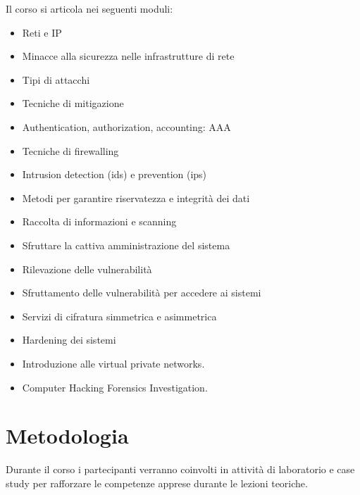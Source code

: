 Il corso si articola nei seguenti moduli:
\begin{itemize}
	
\item Reti e IP                                                 %

\item Minacce alla sicurezza nelle infrastrutture di rete       %

\item Tipi di attacchi                                          %

\item Tecniche di mitigazione                                   %

\item Authentication, authorization, accounting: AAA            %

\item Tecniche di firewalling                   %

\item Intrusion detection (ids)  e prevention (ips)   %

\item Metodi per garantire riservatezza e integrità dei dati    %

\item Raccolta di informazioni e scanning                       %

\item Sfruttare la cattiva amministrazione del sistema          %

\item Rilevazione delle vulnerabilità      %

\item Sfruttamento delle vulnerabilità per accedere ai sistemi  %

\item Servizi di cifratura  simmetrica e asimmetrica   %

\item Hardening dei sistemi                                 %

\item Introduzione alle virtual private networks.               %

\item Computer Hacking Forensics Investigation.               %

\end{itemize}
	
\section{Metodologia}

Durante il corso i partecipanti verranno coinvolti in attività di laboratorio e case study per rafforzare
le competenze apprese durante le lezioni teoriche.
